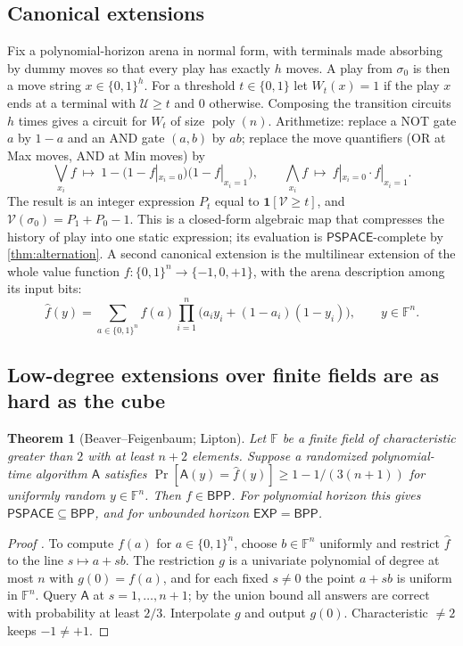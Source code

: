\documentclass[11pt]{amsart}
\theoremstyle{plain}
\newtheorem{theorem}{Theorem}[section]
\theoremstyle{definition}
\theoremstyle{remark}
\numberwithin{equation}{section}
\newcommand{\FF}{\mathbb{F}}
\newcommand{\val}{\mathcal{V}}            %
\newcommand{\pay}{\mathcal{U}}            %
\newcommand{\poly}{\operatorname{poly}}
\newcommand{\cls}[1]{\mathsf{#1}}
\newcommand{\PSPACE}{\cls{PSPACE}}
\newcommand{\EXP}{\cls{EXP}}
\newcommand{\BPP}{\cls{BPP}}
\newcommand{\one}{\mathbf{1}}
\begin{document}
\subsection{Canonical extensions}
Fix a polynomial-horizon arena in normal form, with terminals made absorbing by dummy moves so that every play has exactly $h$ moves. A play from $\sigma_0$ is then a move string $x\in\{0,1\}^h$. For a threshold $t\in\{0,1\}$ let $W_t(x)=1$ if the play $x$ ends at a terminal with $\pay\ge t$ and $0$ otherwise. Composing the transition circuits $h$ times gives a circuit for $W_t$ of size $\poly(n)$. Arithmetize: replace a NOT gate $a$ by $1-a$ and an AND gate $(a,b)$ by $ab$; replace the move quantifiers (OR at Max moves, AND at Min moves) by
\[
\textstyle\bigvee_{x_i}f\ \mapsto\ 1-\bigl(1-f|_{x_i=0}\bigr)\bigl(1-f|_{x_i=1}\bigr),\qquad \bigwedge_{x_i}f\ \mapsto\ f|_{x_i=0}\cdot f|_{x_i=1}.
\]
The result is an integer expression $P_t$ equal to $\one[\val\ge t]$, and $\val(\sigma_0)=P_1+P_0-1$. This is a closed-form algebraic map that compresses the history of play into one static expression; its evaluation is $\PSPACE$-complete by \cref{thm:alternation}. A second canonical extension is the multilinear extension of the whole value function $f\colon\{0,1\}^n\to\{-1,0,+1\}$, with the arena description among its input bits:
\[
\widehat f(y)=\sum_{a\in\{0,1\}^n}f(a)\prod_{i=1}^{n}\bigl(a_iy_i+(1-a_i)(1-y_i)\bigr),\qquad y\in\FF^n.
\]

\subsection{Low-degree extensions over finite fields are as hard as the cube}

\begin{theorem}[Beaver--Feigenbaum; Lipton]\label{thm:worst-average}
Let $\FF$ be a finite field of characteristic greater than $2$ with at least $n+2$ elements. Suppose a randomized polynomial-time algorithm $\mathsf A$ satisfies $\Pr[\mathsf A(y)=\widehat f(y)]\ge 1-1/(3(n+1))$ for uniformly random $y\in\FF^n$. Then $f\in\BPP$. For polynomial horizon this gives $\PSPACE\subseteq\BPP$, and for unbounded horizon $\EXP=\BPP$.
\end{theorem}

\begin{proof}[Proof \textup{\cite{BeaverFeigenbaum,Lipton}}]
To compute $f(a)$ for $a\in\{0,1\}^n$, choose $b\in\FF^n$ uniformly and restrict $\widehat f$ to the line $s\mapsto a+sb$. The restriction $g$ is a univariate polynomial of degree at most $n$ with $g(0)=f(a)$, and for each fixed $s\neq0$ the point $a+sb$ is uniform in $\FF^n$. Query $\mathsf A$ at $s=1,\dots,n+1$; by the union bound all answers are correct with probability at least $2/3$. Interpolate $g$ and output $g(0)$. Characteristic $\neq2$ keeps $-1\neq+1$.
\end{proof}
\end{document}
